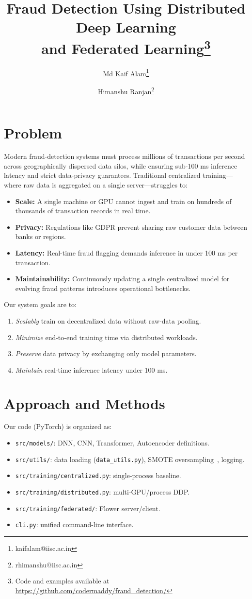 \documentclass[10pt]{article}
\title{Fraud Detection Using Distributed Deep Learning\\and Federated Learning\thanks{Code and examples available at \protect\url{https://github.com/codermaddy/fraud_detection/}}}
\author{
  Md Kaif Alam\thanks{kaifalam@iisc.ac.in} \and
  Himanshu Ranjan\thanks{rhimanshu@iisc.ac.in}
}
\date{}
\begin{document}
\maketitle

\section*{Problem}
Modern fraud-detection systems must process millions of transactions per second across geographically dispersed data silos, while ensuring sub-100 ms inference latency and strict data-privacy guarantees. Traditional centralized training—where raw data is aggregated on a single server—struggles to:
\begin{itemize}
  \item \textbf{Scale:} A single machine or GPU cannot ingest and train on hundreds of thousands of transaction records in real time.
  \item \textbf{Privacy:} Regulations like GDPR prevent sharing raw customer data between banks or regions.
  \item \textbf{Latency:} Real-time fraud flagging demands inference in under 100 ms per transaction.
  \item \textbf{Maintainability:} Continuously updating a single centralized model for evolving fraud patterns introduces operational bottlenecks.
\end{itemize}
Our system goals are to:
\begin{enumerate}
  \item \emph{Scalably} train on decentralized data without raw-data pooling.
  \item \emph{Minimize} end-to-end training time via distributed workloads.
  \item \emph{Preserve} data privacy by exchanging only model parameters.
  \item \emph{Maintain} real-time inference latency under 100 ms.
\end{enumerate}

\section*{Approach and Methods}
Our code (PyTorch) is organized as:
\begin{itemize}
  \item \texttt{src/models/}: DNN, CNN, Transformer, Autoencoder definitions.
  \item \texttt{src/utils/}: data loading (\texttt{data\_utils.py}), SMOTE oversampling~\cite{chawla2002smote}, logging.
  \item \texttt{src/training/centralized.py}: single-process baseline.
  \item \texttt{src/training/distributed.py}: multi-GPU/process DDP.
  \item \texttt{src/training/federated/}: Flower server/client.
  \item \texttt{cli.py}: unified command-line interface.
\end{itemize}
\end{document}
